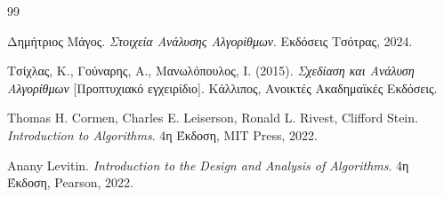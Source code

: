 \documentclass{article}
\begin{document}
\renewcommand{\refname}{Βιβλιογραφία}
\begin{thebibliography}{99}

Δημήτριος Μάγος.
\textit{Στοιχεία Ανάλυσης Αλγορίθμων}.
Εκδόσεις Τσότρας, 2024.

Τσίχλας, Κ., Γούναρης, Α., Μανωλόπουλος, Ι. (2015). \textit{Σχεδίαση και Ανάλυση Αλγορίθμων} [Προπτυχιακό εγχειρίδιο]. Κάλλιπος, Ανοικτές Ακαδημαϊκές Εκδόσεις.

Thomas H. Cormen, Charles E. Leiserson, Ronald L. Rivest, Clifford Stein. 
\textit{Introduction to Algorithms}. 4η Έκδοση, MIT Press, 2022.

Anany Levitin. 
\textit{Introduction to the Design and Analysis of Algorithms}. 4η Έκδοση, Pearson, 2022.
\end{thebibliography}
\end{document}
